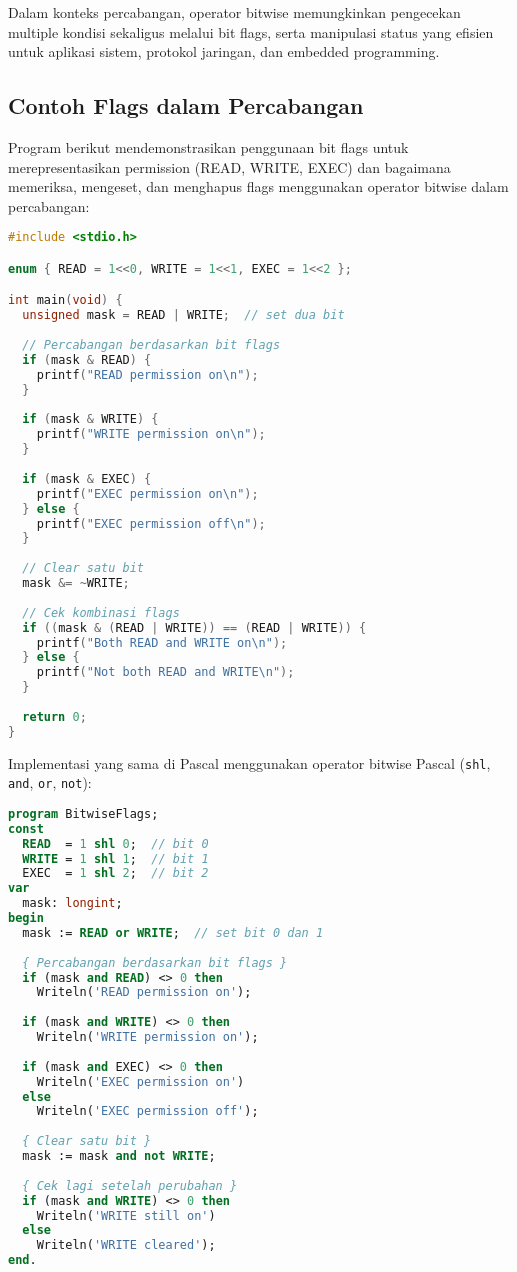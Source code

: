 \documentclass[../main.tex]{subfiles}
\begin{document}
Dalam konteks percabangan, operator bitwise memungkinkan pengecekan multiple kondisi sekaligus melalui bit flags, serta manipulasi status yang efisien untuk aplikasi sistem, protokol jaringan, dan embedded programming.

\subsection{Contoh Flags dalam Percabangan}

Program berikut mendemonstrasikan penggunaan bit flags untuk merepresentasikan permission (READ, WRITE, EXEC) dan bagaimana memeriksa, mengeset, dan menghapus flags menggunakan operator bitwise dalam percabangan:

\begin{lstlisting}[language=C, caption={Bit flags dengan kondisi di C}]
#include <stdio.h>

enum { READ = 1<<0, WRITE = 1<<1, EXEC = 1<<2 };

int main(void) {
  unsigned mask = READ | WRITE;  // set dua bit
  
  // Percabangan berdasarkan bit flags
  if (mask & READ) {
    printf("READ permission on\n");
  }
  
  if (mask & WRITE) {
    printf("WRITE permission on\n");
  }
  
  if (mask & EXEC) {
    printf("EXEC permission on\n");
  } else {
    printf("EXEC permission off\n");
  }
  
  // Clear satu bit
  mask &= ~WRITE;
  
  // Cek kombinasi flags
  if ((mask & (READ | WRITE)) == (READ | WRITE)) {
    printf("Both READ and WRITE on\n");
  } else {
    printf("Not both READ and WRITE\n");
  }
  
  return 0;
}
\end{lstlisting}

Implementasi yang sama di Pascal menggunakan operator bitwise Pascal (\texttt{shl}, \texttt{and}, \texttt{or}, \texttt{not}):

\begin{lstlisting}[language=Pascal, caption={Pergeseran dan bitwise dengan kondisi di Pascal}]
program BitwiseFlags;
const
  READ  = 1 shl 0;  // bit 0
  WRITE = 1 shl 1;  // bit 1
  EXEC  = 1 shl 2;  // bit 2
var
  mask: longint;
begin
  mask := READ or WRITE;  // set bit 0 dan 1
  
  { Percabangan berdasarkan bit flags }
  if (mask and READ) <> 0 then
    Writeln('READ permission on');
  
  if (mask and WRITE) <> 0 then
    Writeln('WRITE permission on');
  
  if (mask and EXEC) <> 0 then
    Writeln('EXEC permission on')
  else
    Writeln('EXEC permission off');
  
  { Clear satu bit }
  mask := mask and not WRITE;
  
  { Cek lagi setelah perubahan }
  if (mask and WRITE) <> 0 then
    Writeln('WRITE still on')
  else
    Writeln('WRITE cleared');
end.
\end{lstlisting}
\end{document}
